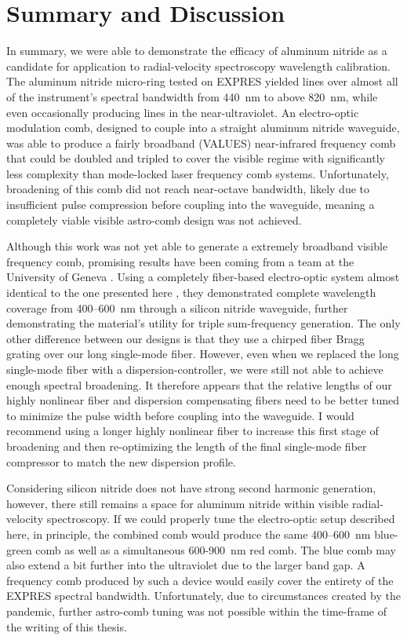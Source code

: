 \section{Summary and Discussion}

In summary, we were able to demonstrate the efficacy of aluminum nitride as a candidate for application to radial-velocity spectroscopy wavelength calibration. The aluminum nitride micro-ring tested on EXPRES yielded lines over almost all of the instrument's spectral bandwidth from 440~\si{\nano\meter} to above 820~\si{\nano\meter}, while even occasionally producing lines in the near-ultraviolet. An electro-optic modulation comb, designed to couple into a straight aluminum nitride waveguide, was able to produce a fairly broadband (VALUES) near-infrared frequency comb that could be doubled and tripled to cover the visible regime with significantly less complexity than mode-locked laser frequency comb systems. Unfortunately, broadening of this comb did not reach near-octave bandwidth, likely due to insufficient pulse compression before coupling into the waveguide, meaning a completely viable visible astro-comb design was not achieved.

Although this work was not yet able to generate a extremely broadband visible frequency comb, promising results have been coming from a team at the University of Geneva \citep{obrzud_visible_2019}. Using a completely fiber-based electro-optic system almost identical to the one presented here \citep{obrzud_microphotonic_2019}, they demonstrated complete wavelength coverage from 400--600~\si{\nano\meter} through a silicon nitride waveguide, further demonstrating the material's utility for triple sum-frequency generation. The only other difference between our designs is that they use a chirped fiber Bragg grating over our long single-mode fiber. However, even when we replaced the long single-mode fiber with a dispersion-controller, we were still not able to achieve enough spectral broadening. It therefore appears that the relative lengths of our highly nonlinear fiber and dispersion compensating fibers need to be better tuned to minimize the pulse width before coupling into the waveguide. I would recommend using a longer highly nonlinear fiber to increase this first stage of broadening and then re-optimizing the length of the final single-mode fiber compressor to match the new dispersion profile.

Considering silicon nitride does not have strong second harmonic generation, however, there still remains a space for aluminum nitride within visible radial-velocity spectroscopy. If we could properly tune the electro-optic setup described here, in principle, the combined comb would produce the same 400--600~\si{\nano\meter} blue-green comb as well as a simultaneous 600-900~\si{\nano\meter} red comb. The blue comb may also extend a bit further into the ultraviolet due to the larger band gap. A frequency comb produced by such a device would easily cover the entirety of the EXPRES spectral bandwidth. Unfortunately, due to circumstances created by the pandemic, further astro-comb tuning was not possible within the time-frame of the writing of this thesis.

